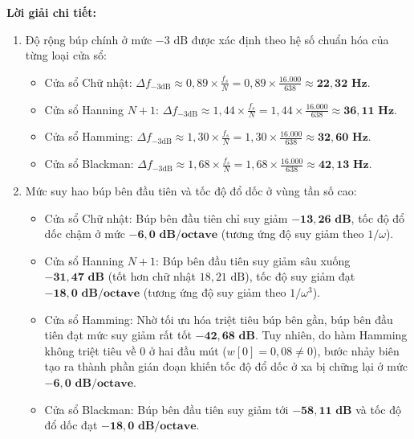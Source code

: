 \textbf{Lời giải chi tiết:}
\begin{enumerate}[label=(\alph*)]
    \item Độ rộng búp chính ở mức $-3\text{ dB}$ được xác định theo hệ số chuẩn hóa của từng loại cửa sổ:
    \begin{itemize}[leftmargin=1.5em, itemsep=2pt]
        \item Cửa sổ Chữ nhật: $\Delta f_{-3\text{dB}} \approx 0{,}89 \times \frac{f_s}{N} = 0{,}89 \times \frac{16.000}{638} \approx \mathbf{22{,}32\text{ Hz}}$.
        \item Cửa sổ Hanning $N+1$: $\Delta f_{-3\text{dB}} \approx 1{,}44 \times \frac{f_s}{N} = 1{,}44 \times \frac{16.000}{638} \approx \mathbf{36{,}11\text{ Hz}}$.
        \item Cửa sổ Hamming: $\Delta f_{-3\text{dB}} \approx 1{,}30 \times \frac{f_s}{N} = 1{,}30 \times \frac{16.000}{638} \approx \mathbf{32{,}60\text{ Hz}}$.
        \item Cửa sổ Blackman: $\Delta f_{-3\text{dB}} \approx 1{,}68 \times \frac{f_s}{N} = 1{,}68 \times \frac{16.000}{638} \approx \mathbf{42{,}13\text{ Hz}}$.
    \end{itemize}

    \item Mức suy hao búp bên đầu tiên và tốc độ đổ dốc ở vùng tần số cao:
    \begin{itemize}[leftmargin=1.5em, itemsep=2pt]
        \item Cửa sổ Chữ nhật: Búp bên đầu tiên chỉ suy giảm $\mathbf{-13{,}26\text{ dB}}$, tốc độ đổ dốc chậm ở mức $\mathbf{-6{,}0\text{ dB/octave}}$ (tương ứng độ suy giảm theo $1/\omega$).
        \item Cửa sổ Hanning $N+1$: Búp bên đầu tiên suy giảm sâu xuống $\mathbf{-31{,}47\text{ dB}}$ (tốt hơn chữ nhật $18{,}21\text{ dB}$), tốc độ suy giảm đạt $\mathbf{-18{,}0\text{ dB/octave}}$ (tương ứng độ suy giảm theo $1/\omega^3$).
        \item Cửa sổ Hamming: Nhờ tối ưu hóa triệt tiêu búp bên gần, búp bên đầu tiên đạt mức suy giảm rất tốt $\mathbf{-42{,}68\text{ dB}}$. Tuy nhiên, do hàm Hamming không triệt tiêu về 0 ở hai đầu mút ($w[0] = 0{,}08 \ne 0$), bước nhảy biên tạo ra thành phần gián đoạn khiến tốc độ đổ dốc ở xa bị chững lại ở mức $\mathbf{-6{,}0\text{ dB/octave}}$.
        \item Cửa sổ Blackman: Búp bên đầu tiên suy giảm tới $\mathbf{-58{,}11\text{ dB}}$ và tốc độ đổ dốc đạt $\mathbf{-18{,}0\text{ dB/octave}}$.
    \end{itemize}


\end{enumerate}
